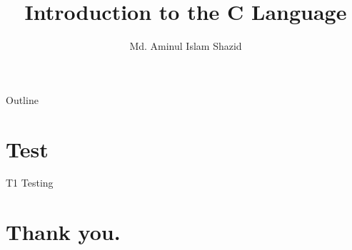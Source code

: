 \documentclass[11pt, aspectratio=169]{beamer}
\title{Introduction to the C Language}
\author{Md. Aminul Islam Shazid}
\date{}
\begin{document}
    {
		\addtocounter{framenumber}{-2}    %

		\begin{frame}
			\titlepage
		\end{frame}

		\begin{frame}{Outline}
			\tableofcontents[subsectionstyle=hide]
		\end{frame}
	}

	\section{Test}
	
	\begin{frame}{T1}
		Testing
	\end{frame}

    \section*{Thank you.}



\end{document}
